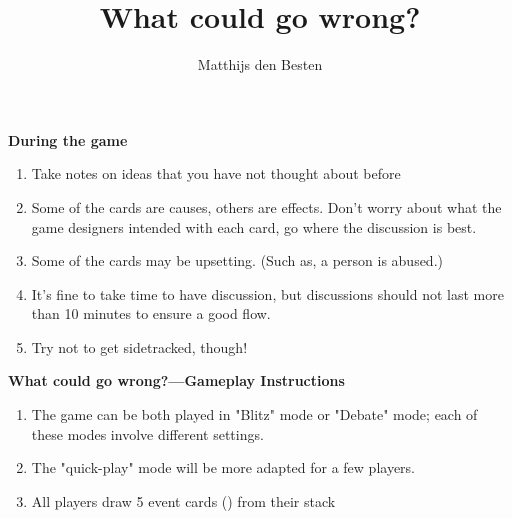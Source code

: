 \documentclass[grid,avery5371]{flashcards}
\title{What could go wrong?}
\author{Matthijs den Besten}
\begin{document}

\begin{flashcard}{
{\bf\small During the game}
\begin{multicols}{2}
\begin{enumerate}\tiny \setlength{\itemsep}{.5ex}
    \item Take notes on ideas that you have not thought about before
    \item Some of the cards are causes, others are effects. Don’t worry about what the game designers intended with each card, go where the discussion is best.
    \item Some of the cards may be upsetting. (Such as, a person is abused.)
    \item It’s fine to take time to have discussion, but discussions should not last more than 10 minutes to ensure a good flow.
    \item Try not to get sidetracked, though!
\end{enumerate}
\end{multicols}
}
{\bf\small What could go wrong?---Gameplay Instructions}
\begin{multicols}{2}
    \begin{enumerate}\tiny \setlength\itemsep{.2ex}

    	\item The game can be both played in "Blitz" mode or "Debate" mode; each of these modes involve different settings.
     	\item The "quick-play" mode will be more adapted for a few players.
        \item All players draw 5 event cards () from their stack


\end{enumerate}
\end{multicols}
\end{flashcard}
\end{document}
